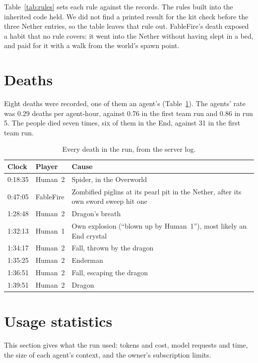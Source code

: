 \documentclass[11pt,a4paper]{article}
\begin{document}
Table~\ref{tab:rules} sets each rule against the records. The rules built into the inherited code held. We did not find a printed result for the kit check before the three Nether entries, so the table leaves that rule out. FableFire's death exposed a habit that no rule covers: it went into the Nether without having slept in a bed, and paid for it with a walk from the world's spawn point.

\section{Deaths}
\label{sec:deaths}

Eight deaths were recorded, one of them an agent's (Table~\ref{tab:deaths}). The agents' rate was 0.29 deaths per agent-hour, against 0.76 in the first team run and 0.86 in run 5. The people died seven times, six of them in the End, against 31 in the first team run.

\begin{table}[t]
  \caption{Every death in the run, from the server log.}
  \label{tab:deaths}
  \small
  \begin{tabularx}{\textwidth}{@{}llX@{}}
    \toprule
    \textbf{Clock} & \textbf{Player} & \textbf{Cause} \\
    \midrule
    0:18:35 & Human~2 & Spider, in the Overworld \\
    0:47:05 & FableFire & Zombified piglins at its pearl pit in the Nether, after its own sword sweep hit one \\
    1:28:48 & Human~2 & Dragon's breath \\
    1:32:13 & Human~1 & Own explosion (``blown up by Human~1''), most likely an End crystal \\
    1:34:17 & Human~2 & Fall, thrown by the dragon \\
    1:35:25 & Human~2 & Enderman \\
    1:36:51 & Human~2 & Fall, escaping the dragon \\
    1:39:51 & Human~2 & Dragon \\
    \bottomrule
  \end{tabularx}
\end{table}

\section{Usage statistics}
\label{sec:usage}

This section gives what the run used: tokens and cost, model requests and time, the size of each agent's context, and the owner's subscription limits.
\end{document}
